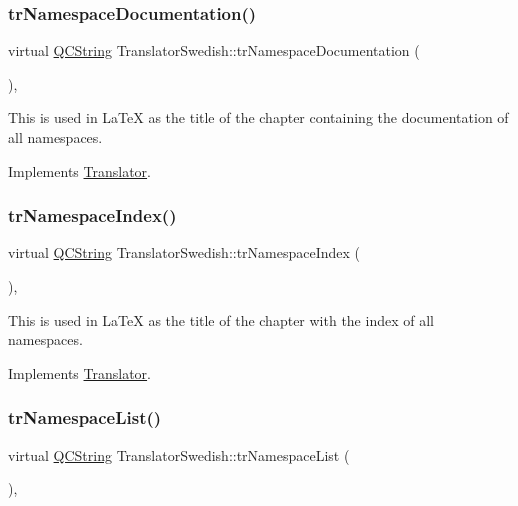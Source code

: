 \subsubsection{\texorpdfstring{trNamespaceDocumentation()}{trNamespaceDocumentation()}}
{\footnotesize\ttfamily virtual \mbox{\hyperlink{class_q_c_string}{Q\+C\+String}} Translator\+Swedish\+::tr\+Namespace\+Documentation (\begin{DoxyParamCaption}{ }\end{DoxyParamCaption})\hspace{0.3cm}{\ttfamily [inline]}, {\ttfamily [virtual]}}

This is used in La\+TeX as the title of the chapter containing the documentation of all namespaces. 

Implements \mbox{\hyperlink{class_translator}{Translator}}.

\mbox{\label{class_translator_swedish_aa37aef60b5eb75ed2e2753edee088ad9}} 
\subsubsection{\texorpdfstring{trNamespaceIndex()}{trNamespaceIndex()}}
{\footnotesize\ttfamily virtual \mbox{\hyperlink{class_q_c_string}{Q\+C\+String}} Translator\+Swedish\+::tr\+Namespace\+Index (\begin{DoxyParamCaption}{ }\end{DoxyParamCaption})\hspace{0.3cm}{\ttfamily [inline]}, {\ttfamily [virtual]}}

This is used in La\+TeX as the title of the chapter with the index of all namespaces. 

Implements \mbox{\hyperlink{class_translator}{Translator}}.

\mbox{\label{class_translator_swedish_ad4375c59e7444984877149df3bd6dd05}} 
\subsubsection{\texorpdfstring{trNamespaceList()}{trNamespaceList()}}
{\footnotesize\ttfamily virtual \mbox{\hyperlink{class_q_c_string}{Q\+C\+String}} Translator\+Swedish\+::tr\+Namespace\+List (\begin{DoxyParamCaption}{ }\end{DoxyParamCaption})\hspace{0.3cm}{\ttfamily [inline]}, {\ttfamily [virtual]}}

